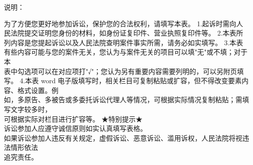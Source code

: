 
\begin{notesection}
\hfuzz=50pt
\color{inkblack}\heiti\fontsize{10.5bp}{16bp}\selectfont 说明：\par
\vspace*{-0.2bp}
\songti\mdseries\fontsize{10.5bp}{16bp}\selectfont
\setlength{\parindent}{20.7bp}
\sloppy

\setlength{\parskip}{0pt}
\vspace*{-5.1bp}为了方便您更好地参加诉讼，保护您的合法权利，请填写本表。
\lawpar
1.起诉时需向人民法院提交证明您身份的材料，如身份证复印件、营业执照复印件等。
\lawpar
2.本表所列内容是您提起诉讼以及人民法院查明案件事实所需，请务必如实填写。
\lawpar
3.本表有些内容可能与您的案件无关，您认为与案件无关的项目可以填"无"或不填；对于本\\[-4.86bp]
表中勾选项可以在对应项打"√"；您认为另有重要内容需要列明的，可以另附页填写。
\lawpar
4.本表 word 电子版填写时，相关栏目可复制粘贴或扩容，但不得改变要素内容、格式设置。例\\[-4.86bp]
如，多原告、多被告或多委托诉讼代理人等情况，可根据实际情况复制粘贴；需填写文字较多时，\\[-4.86bp]
可根据实际对栏目进行扩容等。
\lawpar
{\fzssk ★}特别提示{\fzssk ★}\\[-4.86bp]
\hspace*{20.7bp}诉讼参加人应遵守诚信原则如实认真填写表格。\\[-4.86bp]
\hspace*{20.7bp}如果诉讼参加人违反有关规定，虚假诉讼、恶意诉讼、滥用诉权，人民法院将视违法情形依法\\[-4.86bp]
追究责任。
\end{notesection}
